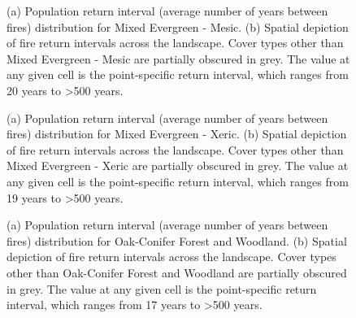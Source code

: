 \begin{figure}[!htbp]
  \centering
  \caption{(a) Population return interval (average number of years between fires) distribution for Mixed Evergreen - Mesic. (b) Spatial depiction of fire return intervals across the landscape. Cover types other than Mixed Evergreen - Mesic are partially obscured in grey. The value at any given cell is the point-specific return interval, which ranges from 20 years to \textgreater 500 years.}
    \label{fig:preturn_megm}
\end{figure}

\begin{figure}[!htbp]
  \centering
  \caption{(a) Population return interval (average number of years between fires) distribution for Mixed Evergreen - Xeric.  (b) Spatial depiction of fire return intervals across the landscape. Cover types other than Mixed Evergreen - Xeric are partially obscured in grey. The value at any given cell is the point-specific return interval, which ranges from 19 years to \textgreater 500 years.}
\label{fig:preturn_megx}
\end{figure}

\begin{figure}[!htbp]
  \centering
  \caption{(a) Population return interval (average number of years between fires) distribution for Oak-Conifer Forest and Woodland.  (b) Spatial depiction of fire return intervals across the landscape. Cover types other than Oak-Conifer Forest and Woodland are partially obscured in grey. The value at any given cell is the point-specific return interval, which ranges from 17 years to \textgreater 500 years.}
\label{fig:preturn_ocfw}
\end{figure}

